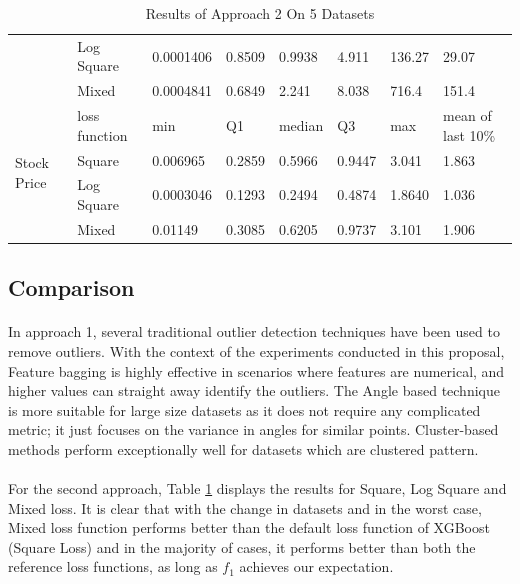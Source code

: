 \documentclass[runningheads]{llncs}
\begin{document}
\begin{table}[h]
\begin{center}
\begin{tabular}{|l|l|l|l|l|l|l|l|}
                                 & Log Square    & 0.0001406 & 0.8509 & 0.9938 & 4.911 & 136.27 & 29.07                  \\ \cline{2-8} 
                                 & Mixed         & 0.0004841 & 0.6849 & 2.241 & 8.038 & 716.4  &  151.4                 \\ \hline
\multirow{4}{*}{Stock Price} & loss function & min        & Q1      & median & Q3     & max    & mean of last 10\% \\ \cline{2-8} 
                                 & Square        & 0.006965 & 0.2859 & 0.5966 & 0.9447 & 3.041 & 1.863                  \\ \cline{2-8} 
                                 & Log Square    & 0.0003046 & 0.1293 & 0.2494 & 0.4874 & 1.8640 &  1.036                 \\ \cline{2-8} 
                                 & Mixed         & 0.01149 & 0.3085 & 0.6205 & 0.9737 & 3.101  & 1.906                  \\ \hline
\end{tabular}
\end{center}
\caption{Results of Approach 2 On 5 Datasets}
\label{5-number-summary-a2}
\end{table}

\subsection{Comparison}
\paragraph{} In approach 1, several traditional outlier detection techniques have been used to remove outliers. With the context of the experiments conducted in this proposal, Feature bagging is highly effective in scenarios where features are numerical, and higher values can straight away identify the outliers. The Angle based technique is more suitable for large size datasets as it does not require any complicated metric; it just focuses on the variance in angles for similar points. Cluster-based methods perform exceptionally well for datasets which are clustered pattern.

\paragraph{} For the second approach, Table \ref{5-number-summary-a2} displays the results for Square, Log Square and Mixed loss. It is clear that with the change in datasets and in the worst case, Mixed loss function performs better than the default loss function of XGBoost (Square Loss) and in the majority of cases, it performs better than both the reference loss functions, as long as $f_1$ achieves our expectation.
\end{document}
